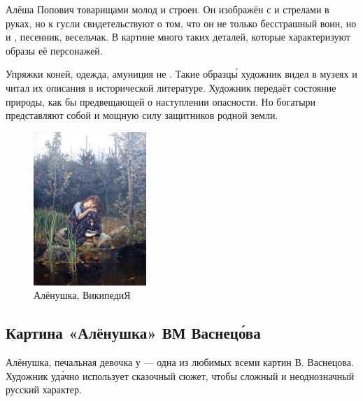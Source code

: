 Алёша Попович  товарищами молод и строен. Он изображён с  и стрелами в руках, но  к  гусли свидетельствуют о том, что он не только бесстрашный воин, но и , песенник, весельчак. В картине много таких деталей, которые характеризуют образы её персонажей.

Упряжки коней, одежда, амуниция не . Такие образц\'{ы} художник видел в музеях и читал их описания в исторической литературе. Художник  передаёт состояние природы, как бы предвещающей о наступлении опасности. Но богатыри представляют собой  и мощную силу защитников родной земли.


\clearpage

\begin{figure}
    \begin{center}
        \includegraphics[width=0.38\textwidth]{img/alyonushka.jpg}
    \end{center}
    \caption{Алёнушка, ВикипедиЯ}
\end{figure}
\subsection{Картина «Алёнушка» ВМ Васнец\'{о}ва}

Алёнушка, печальная девочка у  --- одна из любимых всеми картин В. Васнецова. Художник уд\'{а}чно использует сказочный сюжет, чтобы  сложный и неоднозначный русский характер.


